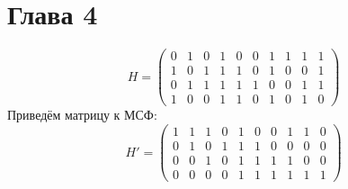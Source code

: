\documentclass{article}
\begin{document}
\section{\texorpdfstring{Глава 4}{Section 4}}
\[
    H =
    \begin{pmatrix}
        0 & 1 & 0 & 1 & 0 & 0 & 1 & 1 & 1 & 1 \\
        1 & 0 & 1 & 1 & 1 & 0 & 1 & 0 & 0 & 1 \\
        0 & 1 & 1 & 1 & 1 & 1 & 0 & 0 & 1 & 1 \\
        1 & 0 & 0 & 1 & 1 & 0 & 1 & 0 & 1 & 0
    \end{pmatrix}
\]
Приведём матрицу к МСФ:
\[
    H' =
    \begin{pmatrix}
        1&1&1&0&1&0&0&1&1&0\\
        0&1&0&1&1&1&0&0&0&0\\
        0&0&1&0&1&1&1&1&0&0\\
        0&0&0&0&1&1&1&1&1&1
    \end{pmatrix}
\]
\end{document}
